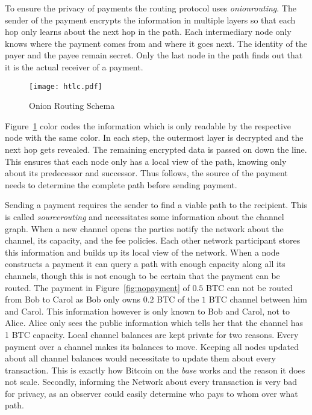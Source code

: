 \documentclass[final]{fhnwreport}       %
\begin{document}
To ensure the privacy of payments the routing protocol uses \emph{\gls{onionrouting}}. The sender of the payment encrypts the information in multiple layers so that each hop only learns about the next hop in the path. Each intermediary node only knows where the payment comes from and where it goes next. The identity of the payer and the payee remain secret. Only the last node in the path finds out that it is the actual receiver of a payment.

\begin{figure}[H]
\centering
\texttt{[image: htlc.pdf]}
\caption{Onion Routing Schema}
\label{fig:onion}
\end{figure}

Figure~\ref{fig:onion} color codes the information which is only readable by the respective node with the same color. In each step, the outermost layer is decrypted and the next hop gets revealed. The remaining encrypted data is passed on down the line. This ensures that each node only has a local view of the path, knowing only about its predecessor and successor. Thus follows, the source of the payment needs to determine the complete path before sending payment.

Sending a payment requires the sender to find a viable path to the recipient. This is called \emph{\gls{sourcerouting}} and necessitates some information about the channel graph. When a new channel opens the parties notify the network about the channel, its capacity, and the fee policies. Each other network participant stores this information and builds up its local view of the network. When a node constructs a payment it can query a path with enough capacity along all its channels, though this is not enough to be certain that the payment can be routed. The payment in Figure~\ref{fig:nopayment} of $0.5$ BTC can not be routed from Bob to Carol as Bob only owns $0.2$ BTC of the $1$ BTC channel between him and Carol. This information however is only known to Bob and Carol, not to Alice. Alice only sees the public information which tells her that the channel has 1 BTC capacity. Local channel balances are kept private for two reasons. Every payment over a channel makes its balances to move. Keeping all nodes updated about all channel balances would necessitate to update them about every transaction. This is exactly how Bitcoin on the \emph{\gls{base}} works and the reason it does not scale. Secondly, informing the Network about every transaction is very bad for privacy, as an observer could easily determine who pays to whom over what path.
\end{document}

